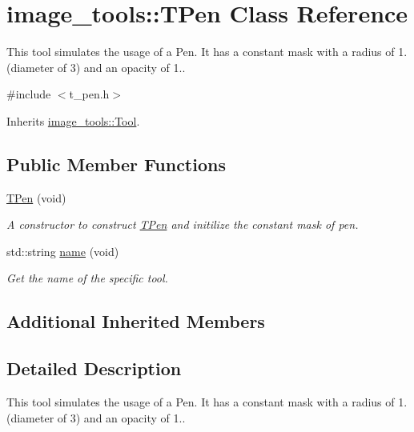 \hypertarget{classimage__tools_1_1TPen}{}\section{image\+\_\+tools\+:\+:T\+Pen Class Reference}
\label{classimage__tools_1_1TPen}


This tool simulates the usage of a Pen. It has a constant mask with a radius of 1. (diameter of 3) and an opacity of 1..  




{\ttfamily \#include $<$t\+\_\+pen.\+h$>$}



Inherits \hyperlink{classimage__tools_1_1Tool}{image\+\_\+tools\+::\+Tool}.

\subsection*{Public Member Functions}
\begin{DoxyCompactItemize}
\item 
\hyperlink{classimage__tools_1_1TPen_aa45d0896c1cb7b764d4a26fad63aa258}{T\+Pen} (void)\hypertarget{classimage__tools_1_1TPen_aa45d0896c1cb7b764d4a26fad63aa258}{}\label{classimage__tools_1_1TPen_aa45d0896c1cb7b764d4a26fad63aa258}

\begin{DoxyCompactList}\small\item\em A constructor to construct \hyperlink{classimage__tools_1_1TPen}{T\+Pen} and initilize the constant mask of pen. \end{DoxyCompactList}\item 
std\+::string \hyperlink{classimage__tools_1_1TPen_ace8f722fce340f23894f12ada93e2e8b}{name} (void)
\begin{DoxyCompactList}\small\item\em Get the name of the specific tool. \end{DoxyCompactList}\end{DoxyCompactItemize}
\subsection*{Additional Inherited Members}


\subsection{Detailed Description}
This tool simulates the usage of a Pen. It has a constant mask with a radius of 1. (diameter of 3) and an opacity of 1.. 

